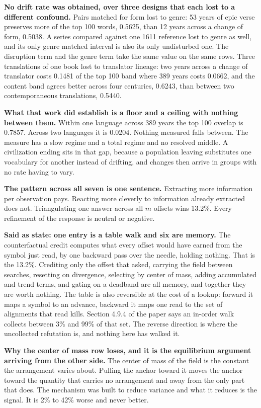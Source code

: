 \textbf{No drift rate was obtained, over three designs that each lost to a different confound.} Pairs matched for form lost to genre: 53 years of epic verse preserves more of the top 100 words, 0.5625, than 12 years across a change of form, 0.5038. A series compared against one 1611 reference lost to genre as well, and its only genre matched interval is also its only undisturbed one. The disruption term and the genre term take the same value on the same rows. Three translations of one book lost to translator lineage: two years across a change of translator costs 0.1481 of the top 100 band where 389 years costs 0.0662, and the content band agrees better across four centuries, 0.6243, than between two contemporaneous translations, 0.5440.

\textbf{What that work did establish is a floor and a ceiling with nothing between them.} Within one language across 389 years the top 100 overlap is 0.7857. Across two languages it is 0.0204. Nothing measured falls between. The measure has a slow regime and a total regime and no resolved middle. A civilization ending sits in that gap, because a population leaving substitutes one vocabulary for another instead of drifting, and changes then arrive in groups with no rate having to vary.

\textbf{The pattern across all seven is one sentence.} Extracting more information per observation pays. Reacting more cleverly to information already extracted does not. Triangulating one answer across all \(m\) offsets wins 13.2\%. Every refinement of the response is neutral or negative.

\textbf{Said as state: one entry is a table walk and six are memory.} The counterfactual credit computes what every offset would have earned from the symbol just read, by one backward pass over the needle, holding nothing. That is the 13.2\%. Crediting only the offset that asked, carrying the field between searches, resetting on divergence, selecting by center of mass, adding accumulated and trend terms, and gating on a deadband are all memory, and together they are worth nothing. The table is also reversible at the cost of a lookup: forward it maps a symbol to an advance, backward it maps one read to the set of alignments that read kills. Section 4.9.4 of the paper says an in-order walk collects between 3\% and 99\% of that set. The reverse direction is where the uncollected refutation is, and nothing here has walked it.

\textbf{Why the center of mass row loses, and it is the equilibrium argument arriving from the other side.} The center of mass of the field is the constant the arrangement varies about. Pulling the anchor toward it moves the anchor toward the quantity that carries no arrangement and away from the only part that does. The mechanism was built to reduce variance and what it reduces is the signal. It is 2\% to 42\% worse and never better.

